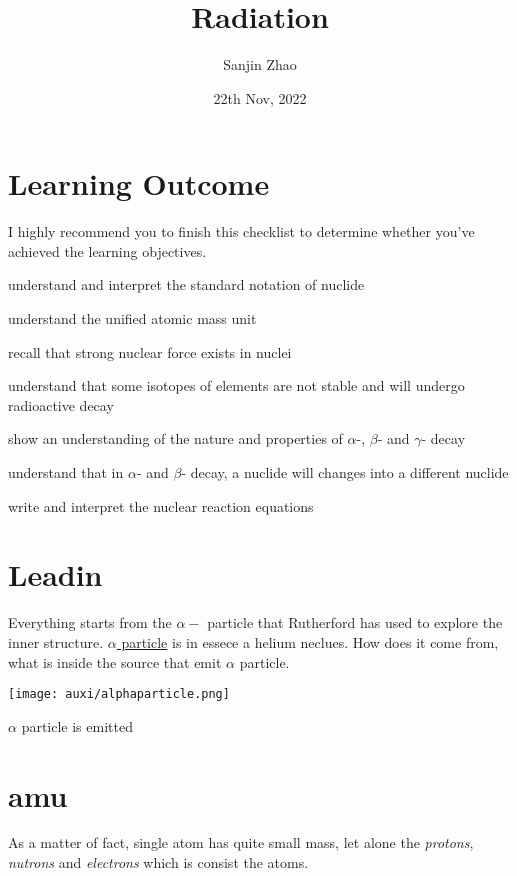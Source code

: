 \documentclass[a4paper]{tufte-handout}
\title{Radiation}
\author{Sanjin Zhao}
\date{22th Nov, 2022}  %
\begin{document}
\maketitle%
\section*{Learning Outcome}
I highly recommend you to finish this checklist to determine whether you've achieved the learning objectives.
\begin{todolist}
  \item understand and interpret the standard notation of nuclide
  \item understand the unified atomic mass unit
  \item recall that strong nuclear force exists in nuclei
  \item understand that some isotopes of elements are not stable and will undergo radioactive decay
  \item show an understanding of the nature and properties of $\alpha$-, $\beta$- and $\gamma$- decay
  \item understand that in $\alpha$- and $\beta$- decay, a nuclide will changes into a different nuclide
  \item write and interpret the nuclear reaction equations
\end{todolist}
\clearpage

\section{Leadin}
Everything starts from the $\alpha-$ particle that Rutherford has used to explore the inner structure. \href{https://www.britannica.com/science/alpha-particle}{$\alpha$ particle} is in essece a helium neclues. How does it come from, what is inside the source that emit $\alpha$ particle. 
\begin{marginfigure}
\centering
\texttt{[image: auxi/alphaparticle.png]}
\caption{$\alpha$ particle is emitted}
\label{fig:alpha particle}
\end{marginfigure}

\section{amu}
As a matter of fact, single atom has quite small mass, let alone the \emph{protons}, \emph{nutrons} and \emph{electrons} which is consist the atoms. 
\end{document}
